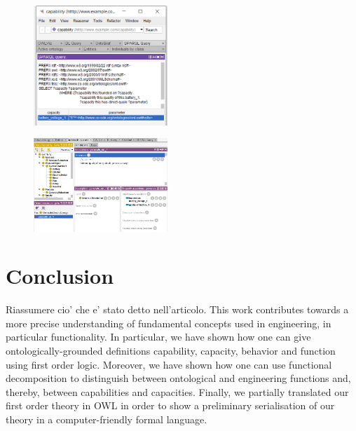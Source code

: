 \documentclass[sw]{iosart2x}
\newcommand{\OWL}{\textnormal{OWL}\xspace}
\newcommand{\TODO}[1]{{\color{red} #1}}
\begin{document}
\begin{figure}
  \centering
  \includegraphics[width=0.45\textwidth]{query_screenshot.PNG}
  \caption{\label{fig:screen_query}}
\end{figure}

\begin{figure}
  \centering
  \includegraphics[width=0.45\textwidth]{entities_screenshot.PNG}
  \caption{\label{fig:screen_entities}}
\end{figure}

\section{Conclusion}\label{sec:conc}
\TODO{Riassumere cio' che e' stato detto nell'articolo.} %
\TODO{This work contributes towards a more precise understanding of fundamental concepts used in engineering, in particular functionality.
In particular, we have shown how one can give ontologically-grounded definitions capability, capacity, behavior and function using first order logic.
Moreover, we have shown how one can use functional decomposition to distinguish between ontological and engineering functions and, thereby, between capabilities and capacities.
Finally, we partially translated our first order theory in \OWL in order to show a preliminary serialisation of our theory in a computer-friendly formal language.}


\end{document}
